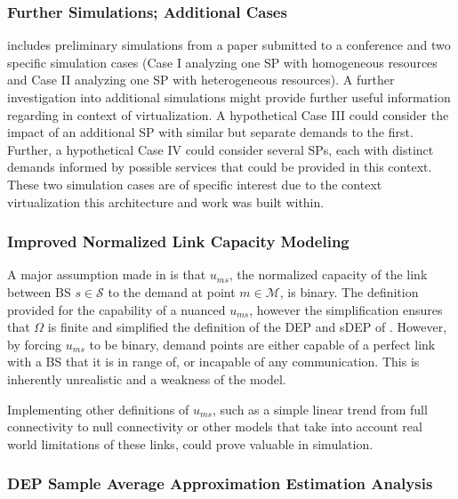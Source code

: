 \documentclass[12pt,dvipsnames]{report}
\begin{document}
\subsubsection{Further Simulations; Additional Cases}

 includes preliminary simulations from a paper submitted to a conference and two specific simulation cases (Case I analyzing one SP with homogeneous resources and Case II analyzing one SP with heterogeneous resources).  A further investigation into additional simulations might provide further useful information regarding in context of virtualization.  A hypothetical Case III could consider the impact of an additional SP with similar but separate demands to the first.  Further, a hypothetical Case IV could consider several SPs, each with distinct demands informed by possible services that could be provided in this context.  These two simulation cases are of specific interest due to the context virtualization this architecture and work was built within.

\subsubsection{Improved Normalized Link Capacity Modeling}

A major assumption made in  is that $u_{ms}$, the normalized capacity of the link between BS $s \in \mathcal{S}$ to the demand at point $m \in \mathcal{M}$, is binary.  The definition provided for the capability of a nuanced $u_{ms}$, however the simplification ensures that $\Omega$ is finite and simplified the definition of the DEP and sDEP of .  However, by forcing $u_{ms}$ to be binary, demand points are either capable of a perfect link with a BS that it is in range of, or incapable of any communication.  This is inherently unrealistic and a weakness of the model.

Implementing other definitions of $u_{ms}$, such as a simple linear trend from full connectivity to null connectivity or other models that take into account real world limitations of these links, could prove valuable in simulation.

\subsubsection{DEP Sample Average Approximation Estimation Analysis}
\end{document}
